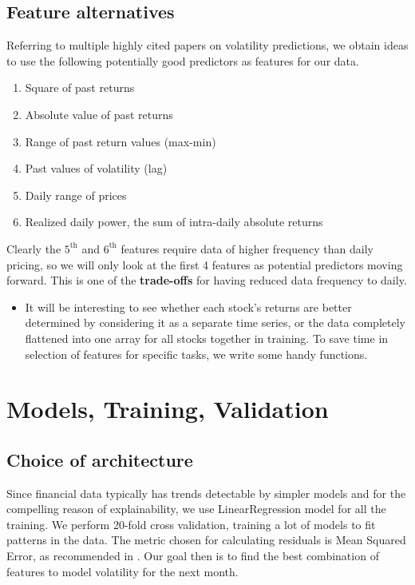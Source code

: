 \documentclass{article}
\begin{document}
\subsection{Feature alternatives}
Referring to multiple highly cited papers on volatility predictions, we obtain ideas to use the following potentially good predictors as features for our data. 
\begin{multicols}{2}
\begin{enumerate}
	\item Square of past returns \cite{bollerslev1987conditionally}
	\item Absolute value of past returns \cite{ding1993long}
	\item Range of past return values (max-min) \cite{alizadeh1999range}
	\item Past values of volatility (lag) \cite{ghysels2006predicting}
	\item Daily range of prices \cite{ghysels2006predicting}
	\item Realized daily power, the sum of intra-daily absolute returns \cite{ghysels2006predicting}
\end{enumerate}
\end{multicols}
Clearly the $5^\text{th}$ and $6^\text{th}$ features require data of higher frequency than daily pricing, so we will only look at the first 4 features as potential predictors moving forward. This is one of the \textbf{trade-offs} for having reduced data frequency to daily. 

\begin{itemize}
	\item It will be interesting to see whether each stock's returns are better determined by considering it as a separate time series, or the data completely flattened into one array for all stocks together in training. To save time in selection of features for specific tasks, we write some handy functions.
\end{itemize}

\section{Models, Training, Validation}
\subsection{Choice of architecture} 
Since financial data typically has trends detectable by simpler models and for the compelling reason of explainability, we use LinearRegression model for all the training. We perform 20-fold cross validation, training a lot of models to fit patterns in the data. The metric chosen for calculating residuals is Mean Squared Error, as recommended in \cite{ghysels2006predicting}. Our goal then is to find the best combination of features to model volatility for the next month.
\end{document}
